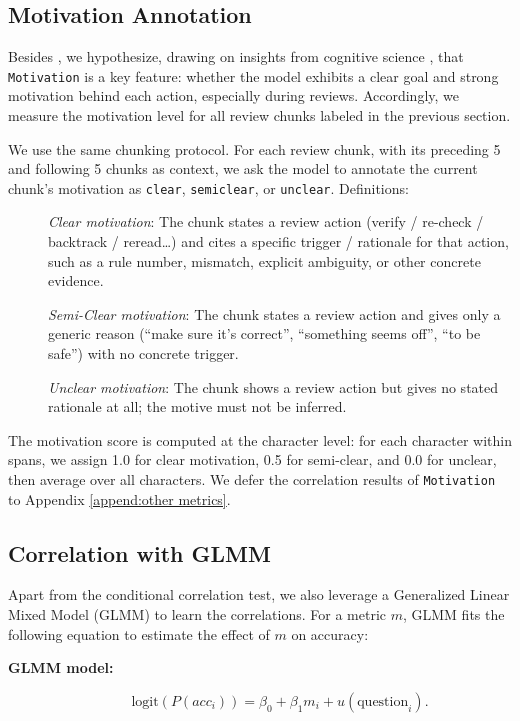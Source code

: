 \subsection{Motivation Annotation}\label{append-motivation}

Besides \review, we hypothesize, drawing on insights from cognitive science \citep{facione1990critical}, that \texttt{Motivation} is a key feature: whether the model exhibits a clear goal and strong motivation behind each action, especially during reviews. Accordingly, we measure the motivation level for all review chunks labeled in the previous section.

We use the same chunking protocol. For each review chunk, with its preceding 5 and following 5 chunks as context, we ask the model to annotate the current chunk’s motivation as \texttt{clear}, \texttt{semiclear}, or \texttt{unclear}. Definitions:

\begin{description}
    \item[] \textit{Clear motivation}: The chunk states a review action (verify / re-check / backtrack / reread…) and cites a specific trigger / rationale for that action, such as a rule number, mismatch, explicit ambiguity, or other concrete evidence.
    \item[] \textit{Semi-Clear motivation}: The chunk states a review action and gives only a generic reason (“make sure it’s correct”, “something seems off”, “to be safe”) with no concrete trigger.
    \item[] \textit{Unclear motivation}: The chunk shows a review action but gives no stated rationale at all; the motive must not be inferred.
\end{description}

The motivation score is computed at the character level: for each character within \Review spans, we assign 1.0 for clear motivation, 0.5 for semi-clear, and 0.0 for unclear, then average over all \Review characters. We defer the correlation results of \texttt{Motivation} to Appendix \ref{append:other metrics}. 

\subsection{Correlation with GLMM}\label{append:glmm}

Apart from the conditional correlation test, we also leverage a Generalized Linear Mixed Model (GLMM) to learn the correlations. For a metric $m$, GLMM fits the following equation to estimate the effect of $m$ on accuracy:
\begin{description}
    \item[\textbf{GLMM model:}] 
    \begin{equation}\label{eqn:glmm}
\text{logit}(P(acc_i)) = \beta_0 + \beta_1 m_i + u({\text{question}_i}).
\end{equation}
\end{description}

